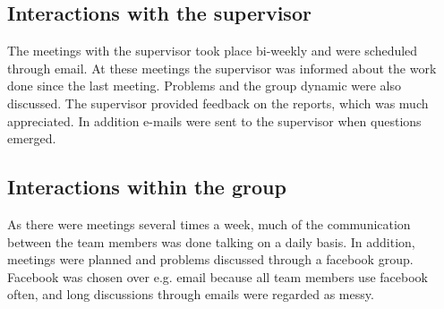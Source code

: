 \normalsize


\subsection{Interactions with the supervisor}
The meetings with the supervisor took place bi-weekly and were scheduled through email. At these meetings the supervisor was informed about the work done since the last meeting. Problems and the group dynamic were also discussed. The supervisor provided feedback on the reports, which was much appreciated. In addition e-mails were sent to the supervisor when questions emerged. 

\subsection{Interactions within the group}
As there were meetings several times a week, much of the communication between the team members was done talking on a daily basis. In addition, meetings were planned and problems discussed through a facebook group. Facebook was chosen over e.g. email because all team members use facebook often, and long discussions through emails were regarded as messy.











